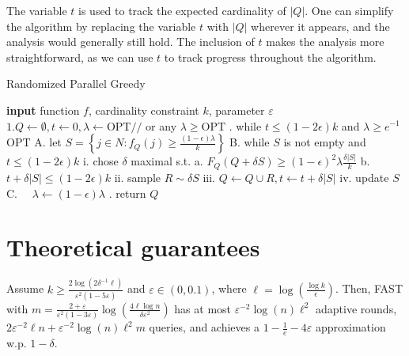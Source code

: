 \documentclass[11pt, a4paper]{article}
\begin{document}
The variable $t$ is used to track the expected cardinality of $|Q|$. One can simplify the algorithm by replacing the variable $t$ with $|Q|$ wherever it appears, and the analysis would generally still hold. The inclusion of $t$ makes the analysis more straightforward, as we can use $t$ to track progress throughout the algorithm.
\begin{algorithm}[H]
\caption{Randomized Parallel Greedy}
\begin{algorithmic}
    	\STATE \textbf{input} function $f$, cardinality constraint $k$, parameter $\varepsilon$
\STATE$1 . Q \leftarrow \emptyset, t \leftarrow 0, \lambda \leftarrow \mathrm{OPT} / /$ or any $\lambda \geq \mathrm{OPT}$
. while $t \leq(1-2 \epsilon) k$ and $\lambda \geq e^{-1}$ OPT
\STATE \quad A. let $S=\left\{j \in N: f_{Q}(j) \geq \frac{(1-\epsilon) \lambda}{k}\right\}$
\STATE \quad B. while $S$ is not empty and $t \leq(1-2 \epsilon) k$
\STATE \quad \quad i. chose $\delta$ maximal s.t.
\STATE \quad \quad \quad a. $F_{Q}(Q+\delta S) \geq(1-\epsilon)^{2} \lambda \frac{\delta|S|}{k}$
\STATE \quad \quad \quad b. $t+\delta|S| \leq(1-2 \epsilon) k$
\STATE \quad \quad ii. sample $R \sim \delta S$
\STATE \quad \quad iii. $Q \leftarrow Q \cup R, t \leftarrow t+\delta|S|$
\STATE \quad \quad iv. update $S$
\STATE \quad C. $\quad \lambda \leftarrow(1-\epsilon) \lambda$
. return $Q$
  \end{algorithmic}
  \label{alg:full}
\end{algorithm}

\section{Theoretical guarantees}
\begin{theorem}
\label{thm:main_FAST} 
Assume $k \geq \frac{2 \log(2\delta^{-1} \ell)}{\varepsilon^2 (1 - 5\varepsilon)}$ and $\varepsilon \in (0, 0.1)$, where  $\ell = \log(\frac{\log k}{\epsilon})$. Then, \textsc{FAST} with $m = \frac{2 + \varepsilon}{\varepsilon^2(1 -  3\varepsilon)} \log(\frac{4\ell\log n}{\delta \varepsilon^2})$ has at most $\varepsilon^{-2} \log(n)  \ell^2$  adaptive rounds,   
$2\varepsilon^{-2}  \ell n +  \varepsilon^{-2} \log(n) \ell^2 m$ queries, and achieves a $1 - \frac{1}{e} - 4 \varepsilon$ approximation 
w.p. $1 - \delta$.
\end{theorem}
\end{document}
